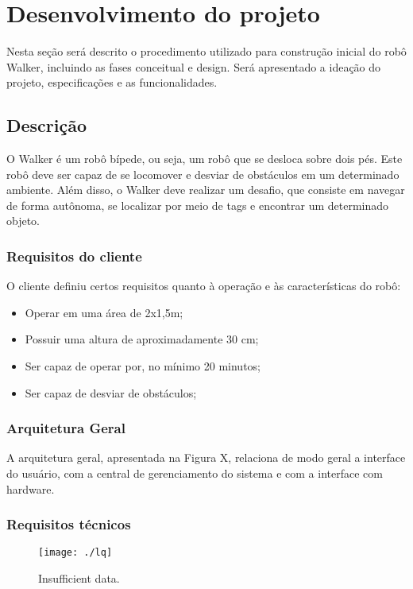 \chapter{Desenvolvimento do projeto}
\label{chap:fundteor}
 Nesta seção será descrito o procedimento utilizado para construção inicial do robô Walker, incluindo as fases conceitual e design.  Será apresentado a ideação do projeto, especificações e as funcionalidades.

\section{Descrição}
 O Walker é um robô bípede, ou seja, um robô que se desloca sobre dois pés. Este robô deve ser capaz de se locomover e desviar de obstáculos em um determinado ambiente. Além disso, o Walker deve realizar um desafio, que consiste em navegar de forma autônoma, se localizar por meio de tags e encontrar um determinado objeto.

\subsection{Requisitos do cliente}
 O cliente definiu certos requisitos quanto à operação e  às características do robô:
 \begin{itemize}
    \item Operar em uma área de 2x1,5m;
    \item Possuir uma altura de aproximadamente 30 cm;
    \item Ser capaz de operar por, no mínimo 20 minutos;
    \item Ser capaz de desviar de obstáculos;
 \end{itemize}
\subsection{Arquitetura Geral}
 A arquitetura geral, apresentada na Figura X, relaciona de modo geral a interface do usuário, com a central de gerenciamento do sistema e com a interface com hardware.
 

\subsection{Requisitos técnicos}
\label{sec:sota}
\lipsum[1]

\begin{figure} [h!]												 
	\centering													 
	\texttt{[image: ./lq]}				 
	\caption{Insufficient data.}		
	\label{img:ihuma}												 
\end{figure}													 

